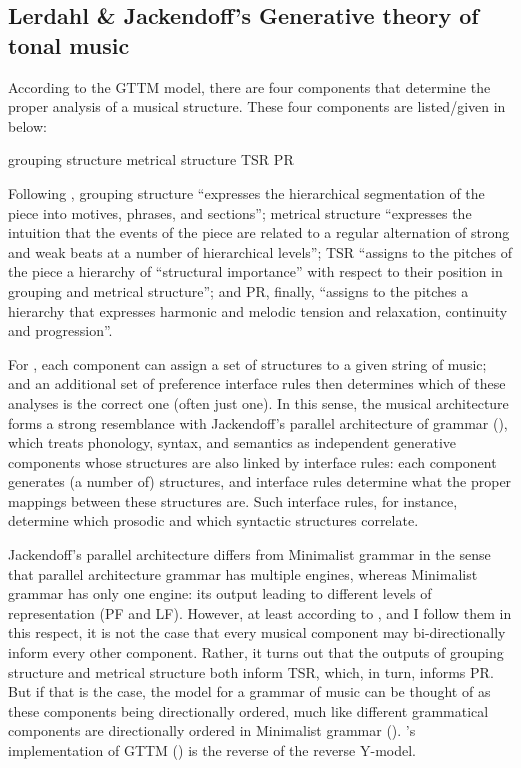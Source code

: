 \documentclass[output=paper]{langsci/langscibook}
\begin{document}
\subsection{Lerdahl \& Jackendoff’s Generative theory of tonal music}
\label{sec:26.3.1}

According to the \gls{GTTM} model, there
are four components that determine the proper analysis of a musical structure.
These four components are listed/given in  below:

\ea\label{ex:26.4}
    \ea grouping structure
    \ex metrical structure
    \ex \gls{TSR}
    \ex \gls{PR}
    \z
\z

Following \textcite[8--9]{LerJac1983}, grouping structure “expresses the
hierarchical segmentation of the piece into motives, phrases, and sections”;
metrical structure “expresses the intuition that the events of the piece are
related to a regular alternation of strong and weak beats at a number of
hierarchical levels”; \gls{TSR} “assigns to the pitches of the piece a
hierarchy of \enquote{structural importance} with respect to their position in
grouping and metrical structure”; and \gls{PR}, finally, “assigns to the
pitches a hierarchy that expresses harmonic and melodic tension and relaxation,
continuity and progression”.

For \citet{LerJac1983}, each component can assign a set of structures to a
given string of music; and an additional set of preference interface rules then
determines which of these analyses is the correct one (often just one). In this
sense, the musical architecture forms a strong resemblance with Jackendoff’s
parallel architecture of grammar
(\citealt{Jackendoff1997,Jackendoff2002,CulJac2005}), which treats phonology,
syntax, and semantics as independent generative components whose structures are
also linked by interface rules: each component generates (a number of)
structures, and interface rules determine what the proper mappings between
these structures are. Such interface rules, for instance, determine which
prosodic and which syntactic structures correlate.

Jackendoff’s parallel architecture differs from Minimalist grammar in the sense
that parallel architecture grammar has multiple engines, whereas Minimalist
grammar has only one engine: its output leading to different levels of
representation (\gls{PF} and \gls{LF}). However, at least according to
\citeauthor{KatzPes2011}, and I follow them in this respect, it is not the case
that every musical component may bi-directionally inform every other component.
Rather, it turns out that the outputs of grouping structure and metrical
structure both inform \gls{TSR}, which, in turn, informs \gls{PR}. But if that
is the case, the model for a grammar of music can be thought of as these
components being directionally ordered, much like different grammatical
components are directionally ordered in Minimalist grammar ().
\citeauthor{KatzPes2011}’s implementation of GTTM () is
the reverse of the reverse Y-model.
\end{document}
